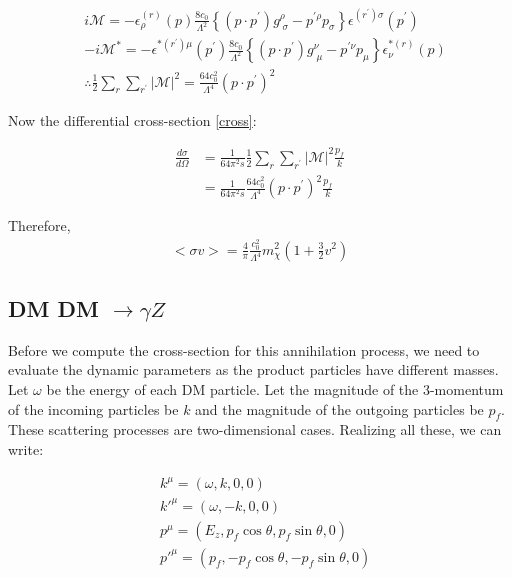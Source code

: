 \documentclass[12pt]{report}
\begin{document}
\begin{align*}
&i \mathcal{M} = -\epsilon^{(r)}_\rho(p) \frac{8c_0}{\Lambda^2} \left\{ (p\cdot p^\prime) g^\rho_{\; \sigma }- p^{\prime \rho} p_\sigma \right\} \epsilon^{(r^\prime)\sigma} (p^\prime)\\
& -i \mathcal{M}^* = -\epsilon^{*(r^\prime) \mu} (p^\prime) \frac{8c_0}{\Lambda^2} \left\{ (p\cdot p^\prime) g^\nu_{\; \mu }- p^{\prime \nu} p_\mu \right\} \epsilon^{*(r)}_\nu (p)\\
&\therefore \frac{1}{2} \sum_r \sum_{r^\prime} |\mathcal{M}|^2 = \frac{64 c^2_0}{\Lambda^4} (p \cdot p^\prime)^2
\end{align*}

Now the differential cross-section \ref{cross}:

\begin{align*}
\frac{d\sigma}{d\Omega} &= \frac{1}{64 \pi^2 s}\frac{1}{2} \sum_r \sum_{r^\prime} |\mathcal{M}|^2  \frac{p_f}{k}\\
&= \frac{1}{64 \pi^2 s}  \frac{64 c^2_0}{\Lambda^4} (p \cdot p^\prime)^2 \frac{p_f}{k}
\end{align*}


Therefore,
\begin{align}
<\sigma v> = \frac{4}{\pi} \frac{c^2_0}{\Lambda^4} m^2_\chi \left(1+\frac{3}{2} v^2 \right) \label{ggcross}
\end{align}



\subsection{DM DM $\longrightarrow \gamma Z$}




Before we compute the cross-section for this annihilation process, we need to evaluate the dynamic parameters as the product particles have different masses.\\

Let $\omega$ be the energy of each DM particle.  Let the magnitude of the 3-momentum of the incoming particles be $k$ and the magnitude of the outgoing particles be $p_f$. These scattering processes are two-dimensional cases. Realizing all these, we can write:


\begin{align*}
&k^\mu=(\omega,k,0,0)\\
&k\prime^\mu =(\omega,-k,0,0)\\
&p^\mu =(E_z,p_f \cos\theta, p_f \sin\theta,0)\\
&p\prime^\mu =(p_f,-p_f \cos\theta, -p_f \sin\theta,0)
\end{align*}
\end{document}
